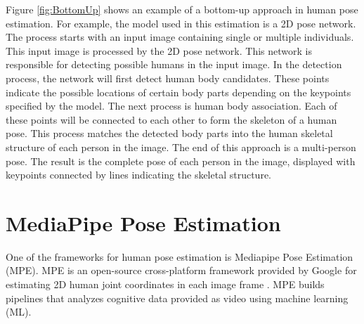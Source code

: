 Figure \ref{fig:BottomUp} shows an example of a bottom-up approach in human pose estimation. For example, the model used in this estimation is a 2D pose network. The process starts with an input image containing single or multiple individuals. This input image is processed by the 2D pose network. This network is responsible for detecting possible humans in the input image. In the detection process, the network will first detect human body candidates. These points indicate the possible locations of certain body parts depending on the keypoints specified by the model. The next process is human body association. Each of these points will be connected to each other to form the skeleton of a human pose. This process matches the detected body parts into the human skeletal structure of each person in the image. The end of this approach is a multi-person pose. The result is the complete pose of each person in the image, displayed with keypoints connected by lines indicating the skeletal structure.

\section{MediaPipe Pose Estimation}
One of the frameworks for human pose estimation is Mediapipe Pose Estimation (MPE). MPE is an open-source cross-platform framework provided by Google for estimating 2D human joint coordinates in each image frame \cite{MPE}. MPE builds pipelines that analyzes cognitive data provided as video using machine learning (ML).

